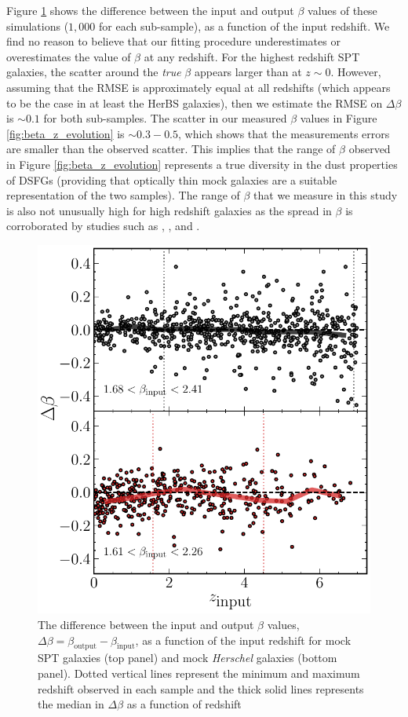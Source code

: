 Figure \ref{fig:beta_z_simulation} shows the difference between the input and output $\beta$ values of these simulations ($1,000$ for each sub-sample), as a function of the input redshift. We find no reason to believe that our fitting procedure underestimates or overestimates the value of $\beta$ at any redshift. For the highest redshift SPT galaxies, the scatter around the \textit{true} $\beta$ appears larger than at $z \sim 0$. However, assuming that the RMSE is approximately equal at all redshifts (which appears to be the case in at least the HerBS galaxies), then we estimate the RMSE on $\Delta \beta$ is $\sim 0.1$ for both sub-samples. The scatter in our measured $\beta$ values in Figure \ref{fig:beta_z_evolution} is $\sim 0.3 - 0.5$, which shows that the measurements errors are smaller than the observed scatter. This implies that the range of $\beta$ observed in Figure \ref{fig:beta_z_evolution} represents a true diversity in the dust properties of DSFGs (providing that optically thin mock galaxies are a suitable representation of the two samples). The range of $\beta$ that we measure in this study is also not unusually high for high redshift galaxies as the spread in $\beta$ is corroborated by studies such as \citealt{daCunha_2021}, \citealt{Cooper_2022}, \citealt{Ismail_2023} and \citealt{Witstok_2023}.

\begin{figure}
	\centering
	\includegraphics[width=0.74\columnwidth]{figures/beta_simulations.pdf}
	\caption[Difference between input and output $\beta$ from simulations of mock galaxies]{The difference between the input and output $\beta$ values, $\Delta \beta = \beta_{\textrm{output}} - \beta_{\textrm{input}}$, as a function of the input redshift for mock SPT galaxies (top panel) and mock \textit{Herschel} galaxies (bottom panel). Dotted vertical lines represent the minimum and maximum redshift observed in each sample and the thick solid lines represents the median in $\Delta \beta$ as a function of redshift}
	\label{fig:beta_z_simulation}
\end{figure}

